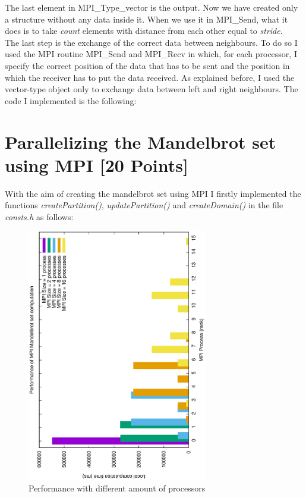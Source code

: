 \documentclass[unicode,11pt,a4paper,oneside,numbers=endperiod,openany]{scrartcl}
\begin{document}
The last element in MPI\_Type\_vector is the output. Now we have created only a structure without any data inside it. When we use it in MPI\_Send, what it does is to take \textit{count} elements with distance from each other equal to \textit{stride}.\\ The last step is the exchange of the correct data between neighbours. To do so I used the MPI routine MPI\_Send and MPI\_Recv in which, for each processor, I specify the correct position of the data that has to be sent and the position in which the receiver has to put the data received. As explained before, I used the vector-type object only to exchange data between left and right neighbours. The code I implemented is the following:\\



\section{Parallelizing the Mandelbrot set using MPI [20 Points]}
With the aim of creating the mandelbrot set using MPI I firstly implemented the functions \textit{createPartition()}, \textit{updatePartition()} and \textit{createDomain()} in the file \textit{consts.h} as follows:


\begin{figure}[h!]
	\hspace{-1.5cm}\includegraphics[width=0.7\textwidth, angle=-90]{images/perf.ps}
	\vspace{1cm}
	\caption{Performance with different amount of processors}
	\label{fig:mandelPerf}
\end{figure}
\end{document}
